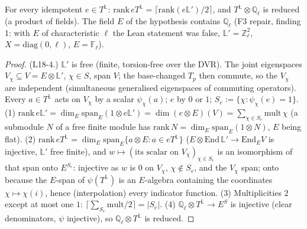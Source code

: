 \begin{lemma}\label{lem:heckerankone}
  \leanok
  For every idempotent $e\in T^{\mathbb L}$: $\mathrm{rank}\,eT^{\mathbb L}=\lceil\mathrm{rank}(e\mathbb L')/2\rceil$, and
  $T^{\mathbb L}\otimes\mathbb Q_\ell$ is reduced (a product of fields). The field $E$ of the hypothesis contains $\mathbb Q_\ell$
  (F3 repair, finding 1: with $E$ of characteristic $\ell$ the Lean statement was false, $\mathbb L'=\mathbb Z_\ell^2$,
  $X=\mathrm{diag}(0,\ell)$, $E=\mathbb F_\ell$).
\end{lemma}
\begin{proof}
  \leanok
  (L18-4.) $\mathbb L'$ is free (finite, torsion-free over the DVR). The joint eigenspaces $V_\chi\subseteq V=E\otimes\mathbb L'$,
  $\chi\in S$, span $V$; the base-changed $T_p$ then commute, so the $V_\chi$ are independent (simultaneous generalised
  eigenspaces of commuting operators). Every $a\in T^{\mathbb L}$ acts on $V_\chi$ by a scalar $\psi_\chi(a)$; $e$ by $0$ or $1$;
  $S_e:=\{\chi:\psi_\chi(e)=1\}$. (1) $\mathrm{rank}\,e\mathbb L'=\dim_E\mathrm{span}_E(1\otimes e\mathbb L')=\dim(e\otimes E)(V)=
  \sum_{\chi\in S_e}\mathrm{mult}\,\chi$ (a submodule $N$ of a free finite module has $\mathrm{rank}\,N=\dim_E\mathrm{span}_E(1\otimes N)$,
  $E$ being flat). (2) $\mathrm{rank}\,eT^{\mathbb L}=\dim_E\mathrm{span}_E\{a\otimes E:a\in eT^{\mathbb L}\}$ ($E\otimes\mathrm{End}\,\mathbb L'\to
  \mathrm{End}_E V$ is injective, $\mathbb L'$ free finite), and $w\mapsto(\text{its scalar on }V_\chi)_{\chi\in S_e}$ is an
  isomorphism of that span onto $E^{S_e}$: injective as $w$ is $0$ on $V_\chi$, $\chi\notin S_e$, and the $V_\chi$ span; onto because
  the $E$-span of $\psi(T^{\mathbb L})$ is an $E$-algebra containing the coordinates $\chi\mapsto\chi(i)$, hence (interpolation) every
  indicator function. (3) Multiplicities $2$ except at most one $1$: $\lceil\sum_{S_e}\mathrm{mult}/2\rceil=|S_e|$. (4)
  $\mathbb Q_\ell\otimes T^{\mathbb L}\to E^S$ is injective (clear denominators, $\psi$ injective), so $\mathbb Q_\ell\otimes T^{\mathbb L}$ is
  reduced.
\end{proof}

